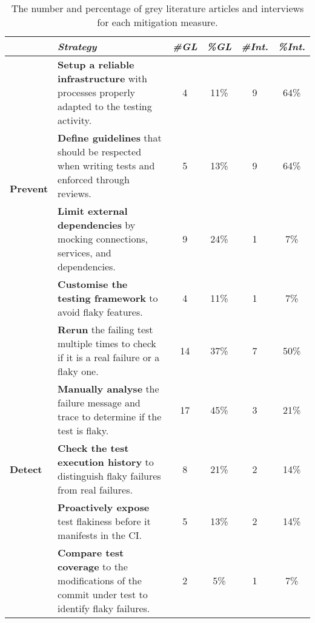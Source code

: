 \begin{table*}[htbp]
\vspace{-0.6em}
\centering
\caption{The number and percentage of grey literature articles and interviews for each mitigation measure.}\label{table:strategies}
\vspace{-1.1em}
\begin{tabularx}{\textwidth}{lXcccc}
 \cline{2-6}
     \multicolumn{1}{c}{} &  \textbf{\textit{Strategy}}  & \textbf{\textit{\#GL}} & \textbf{\textit{\%GL}} & \textbf{\textit{\#Int.}} & \textbf{\textit{\%Int.}}\\  \cline{2-4}
    \hline
    
    \multirow{4}{*}{{\textbf{Prevent}}} &  \textbf{Setup a reliable infrastructure} with processes properly adapted to the testing activity.
     & 4 & 11\% & 9 & 64\% \\  %
     & \textbf{Define guidelines} that should be respected when writing tests and enforced through reviews.   & 5 & 13\% & 9 & 64\%\\  %
    & \textbf{Limit external dependencies} by mocking connections, services, and dependencies. & 9 & 24\% & 1 & 7\% \\  %
    
    & \textbf{Customise the testing framework} to avoid flaky features. & 4 & 11\% & 1 & 7\% \\  \hline
    
    
    \multirow{5}{*}{{\textbf{Detect}}} 
    
    & \textbf{Rerun} the failing test multiple times to check if it is a real failure or a flaky one.  & 14 & 37\% & 7 & 50\% \\  %
    & \textbf{Manually analyse} the failure message and trace to determine if the test is flaky.  & 17 & 45\% & 3 & 21\% \\ %
    & \textbf{Check the test execution history} to distinguish flaky failures from real failures.  & 8 & 21\% & 2 & 14\% \\ %
    & \textbf{Proactively expose} test flakiness before it manifests in the CI.   & 5 & 13\% & 2 & 14\%\\ 
    & \textbf{Compare test coverage} to the modifications of the commit under test to identify flaky failures.  & 2 & 5\% & 1 & 7\% \\ 
      \hline
    
    
    

\end{tabularx}
\end{table*}
